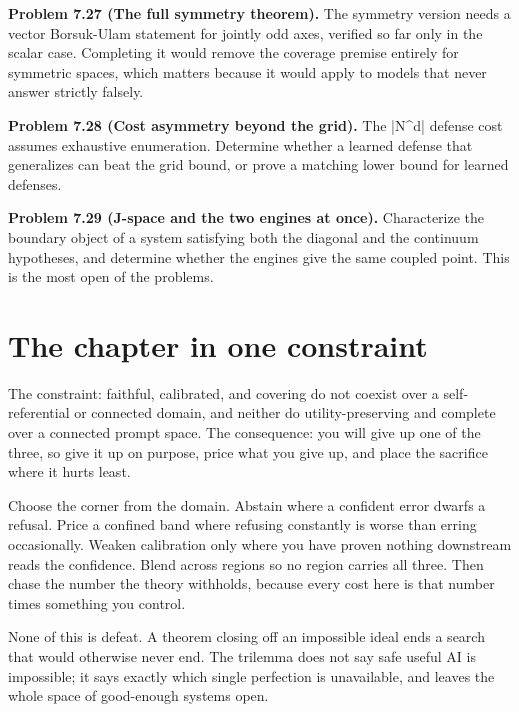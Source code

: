\documentclass{memoir}
\begin{document}
\textbf{Problem 7.27 (The full symmetry theorem).} The symmetry version needs a vector
Borsuk-Ulam statement for jointly odd axes, verified so far only in the scalar
case. Completing it would remove the coverage premise entirely for symmetric
spaces, which matters because it would apply to models that never answer
strictly falsely.

\textbf{Problem 7.28 (Cost asymmetry beyond the grid).} The \LeanVerb|N^d| defense cost assumes
exhaustive enumeration. Determine whether a learned defense that generalizes can
beat the grid bound, or prove a matching lower bound for learned defenses.

\textbf{Problem 7.29 (J-space and the two engines at once).} Characterize the boundary object
of a system satisfying both the diagonal and the continuum hypotheses, and
determine whether the engines give the same coupled point. This is the most open
of the problems.



\section{The chapter in one constraint}\label{Two--Schemas--of--Impossibility-005F-005F-005F--Machine--Checked--Limits--of--Trustworthy--Machine--Learning-005F-005F-005F--and--Why--They--Tighten--with--Capability----What--It--Means--for--AI--Safety----The--chapter--in--one--constraint}

The constraint: faithful, calibrated, and covering do not coexist over a
self-referential or connected domain, and neither do utility-preserving and
complete over a connected prompt space. The consequence: you will give up one of
the three, so give it up on purpose, price what you give up, and place the
sacrifice where it hurts least.

Choose the corner from the domain. Abstain where a confident error dwarfs a
refusal. Price a confined band where refusing constantly is worse than erring
occasionally. Weaken calibration only where you have proven nothing downstream
reads the confidence. Blend across regions so no region carries all three. Then
chase the number the theory withholds, because every cost here is that number
times something you control.

None of this is defeat. A theorem closing off an impossible ideal ends a search
that would otherwise never end. The trilemma does not say safe useful AI is
impossible; it says exactly which single perfection is unavailable, and leaves
the whole space of good-enough systems open.
\end{document}
